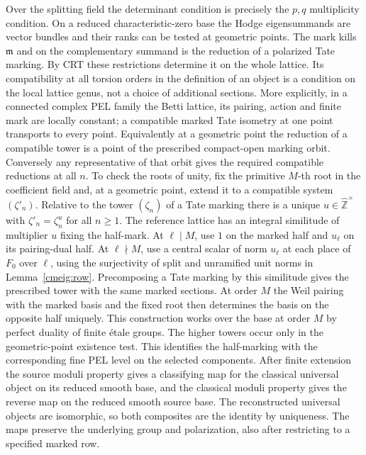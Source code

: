 Over the splitting field the determinant condition is precisely
the \(p,q\) multiplicity condition. On a reduced
characteristic-zero base the Hodge eigensummands are vector bundles
and their ranks can be tested at geometric points. The mark kills
\(\mathfrak m\) and on the complementary summand is the reduction
of a polarized Tate marking. By CRT these restrictions determine
it on the whole lattice. Its compatibility at all torsion orders
in the definition of an object is a condition on the local
lattice genus, not a choice of additional sections. More explicitly,
in a connected complex PEL family the Betti lattice, its pairing,
action and finite mark are locally constant; a compatible marked
Tate isometry at one point transports to every point. Equivalently
at a geometric point the reduction of a compatible tower is a
point of the prescribed compact-open marking orbit. Conversely
any representative of that orbit gives the required compatible
reductions at all \(n\). To check the roots of unity, fix the
primitive \(M\)-th root in the coefficient field and, at a geometric
point, extend it to a compatible system \((\zeta'_n)\). Relative
to the tower \((\zeta_n)\) of a Tate marking there is a unique
\(u\in\widehat{\mathbb Z}^{\times}\) with \(\zeta'_n=\zeta_n^u\)
for all \(n\ge1\). The reference lattice has an
integral similitude of multiplier \(u\) fixing the half-mark.
At \(\ell\mid M\), use \(1\) on the marked half and \(u_\ell\) on
its pairing-dual half. At \(\ell\nmid M\), use a central scalar of
norm \(u_\ell\) at each place of \(F_0\) over \(\ell\), using the
surjectivity of split and unramified unit norms in Lemma~\ref{cmeig:row}.
Precomposing a Tate marking by this similitude gives the prescribed
tower with the same marked sections. At order \(M\) the Weil pairing
with the marked basis and the fixed root then determines the basis
on the opposite half uniquely. This construction works over the
base at order \(M\) by perfect duality of finite étale groups. The
higher towers occur only in the geometric-point existence test.
This identifies the half-marking with the corresponding fine PEL
level on the selected components. After finite extension the
source moduli property gives a classifying map for the classical
universal object on its reduced smooth base, and the classical
moduli property gives the reverse map on the reduced smooth
source base. The reconstructed universal objects are isomorphic,
so both composites are the identity by uniqueness. The maps
preserve the underlying group and polarization, also after
restricting to a specified marked row.

